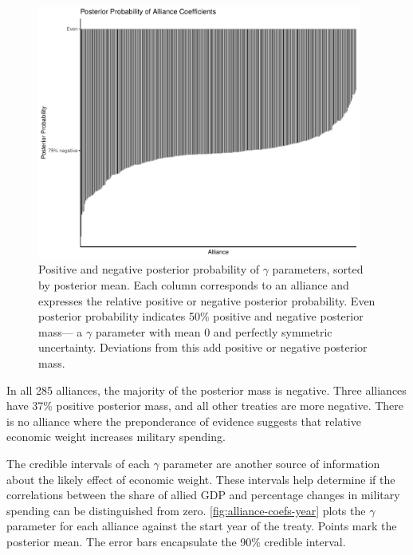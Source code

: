 \documentclass[12pt]{article}
\begin{document}
\begin{figure}[htbp]
	\centering
		\includegraphics[width=0.95\textwidth]{full-post-prob.pdf}
	\caption{Positive and negative posterior probability of $\gamma$ parameters, sorted by posterior mean. Each column corresponds to an alliance and expresses the relative positive or negative posterior probability. Even posterior probability indicates 50\% positive and negative posterior mass--- a $\gamma$ parameter with mean 0 and perfectly symmetric uncertainty. Deviations from this add positive or negative posterior mass.}
	\label{fig:full-post-prob}
\end{figure}


In all 285 alliances, the majority of the posterior mass is negative.  
Three alliances have 37\% positive posterior mass, and all other treaties are more negative. 
There is no alliance where the preponderance of evidence suggests that relative economic weight increases military spending. 


The credible intervals of each $\gamma$ parameter are another source of information about the likely effect of economic weight.
These intervals help determine if the correlations between the share of allied GDP and percentage changes in military spending can be distinguished from zero. 
\autoref{fig:alliance-coefs-year} plots the $\gamma$ parameter for each alliance against the start year of the treaty.
Points mark the posterior mean. 
The error bars encapsulate the 90\% credible interval.
\end{document}
